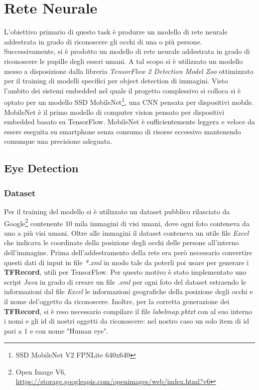 \documentclass[11pt]{article}
\begin{document}
\newpage

\section{Rete Neurale}
L’obiettivo primario di questo task è produrre un modello di rete neurale addestrata in grado di riconoscere gli occhi di una o più persone. Successivamente, si è prodotto un modello di rete neurale addestrata in grado di riconoscere le pupille degli esseri umani.
\newline
A tal scopo si è utilizzato un modello messo a disposizione dalla libreria \textit{TensorFlow 2 Detection Model Zoo} ottimizzato per il training di modelli specifici per object detection di immagini. Visto l’ambito dei sistemi embedded nel quale il progetto complessivo si colloca si è optato per un modello SSD MobileNet\footnote{SSD MobileNet V2 FPNLite 640x640}, una CNN pensata per dispositivi mobile. MobileNet è il primo modello di computer vision pensato per dispositivi embedded basato su TensorFlow. MobileNet è sufficientemente leggera e veloce da essere eseguita su smartphone senza consumo di risorse eccessivo mantenendo comunque una precisione adeguata.

\newpage

\subsection{Eye Detection}
\subsubsection{Dataset}
Per il training del modello si è utilizzato un dataset pubblico rilasciato da Google\footnote{Open Image V6, \url{https://storage.googleapis.com/openimages/web/index.html?v6}} contenente 10 mila immagini di visi umani, dove ogni foto conteneva da uno a più visi umani.
\newline
Oltre alle immagini il dataset conteneva un utile file \textit{Excel} che indicava le coordinate della posizione degli occhi delle persone all'interno dell'immagine.
\newline \newline
Prima dell'addestramento della rete era però necessario convertire questi dati di input in file \textit{*.xml} in modo tale da poterli poi usare per generare i \textbf{TFRecord}, utili per TensorFlow. Per questo motivo è stato implementato uno script \textit{Java} in grado di creare un file \textit{.xml} per ogni foto del dataset estraendo le informazioni dal file \textit{Excel} le informazioni geografiche della posizione degli occhi e il nome del'oggetto da riconoscere. 
Inoltre, per la corretta generazione dei \textbf{TFRecord}, si è reso necessario compilare il file \textit{labelmap.pbtxt} con al suo interno i nomi e gli id di nostri oggetti da riconoscere: nel nostro caso un solo item di id pari a 1 e con nome "Human eye".
\end{document}
